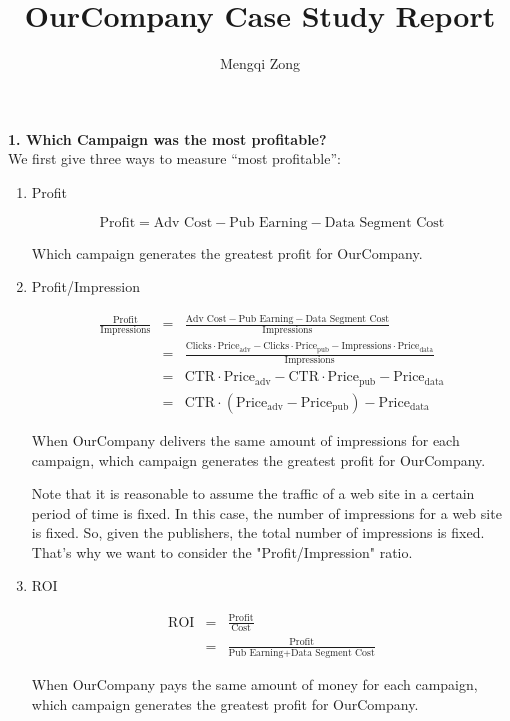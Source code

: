 \documentclass[12pt]{article}
\title{OurCompany Case Study Report}
\author{Mengqi Zong}
\begin{document}
\maketitle

\setlength{\parindent}{0in}

{\bf 1. Which Campaign was the most profitable?} \\

We first give three ways to measure ``most profitable'':

\begin{enumerate}
  \item Profit

	\begin{equation*}
		\text{Profit} = \text{Adv Cost} - \text{Pub Earning} - \text{Data Segment Cost}
	\end{equation*}

	Which campaign generates the greatest profit for OurCompany.

  \item Profit/Impression

	\begin{eqnarray*}
		\frac {\text{Profit}}{\text{Impressions}}
        &=& \frac {\text{Adv Cost} - \text{Pub Earning} - \text{Data Segment Cost}}{\text{Impressions}} \\
        &=& \frac {\text{Clicks} \cdot \text{Price}_{\text{adv}} - \text{Clicks} \cdot \text{Price}_{\text{pub}}  - \text{Impressions} \cdot \text{Price}_{\text{data}}}{\text{Impressions}} \\
        &=& \text{CTR} \cdot \text{Price}_{\text{adv}} - \text{CTR} \cdot \text{Price}_{\text{pub}} - \text{Price}_{\text{data}} \\
        &=& \text{CTR} \cdot (\text{Price}_{\text{adv}} - \text{Price}_{\text{pub}}) - \text{Price}_{\text{data}}
	\end{eqnarray*}

    When OurCompany delivers the same amount of impressions for each campaign, which campaign generates the greatest profit for OurCompany.

    Note that it is reasonable to assume the traffic of a web site in a certain period of time is fixed. In this case, the number of impressions for a web site is fixed. So, given the publishers, the total number of impressions is fixed. That's why we want to consider the "Profit/Impression" ratio.
	
  \item ROI

	\begin{eqnarray*}
		\text{ROI} &=& \frac {\text{Profit}} {\text{Cost}} \\
				   &=& \frac {\text{Profit}} {\text{Pub Earning} + \text{Data Segment Cost}}
	\end{eqnarray*}
	
    When OurCompany pays the same amount of money for each campaign, which campaign generates the greatest profit for OurCompany.
\end{enumerate}
\end{document}
